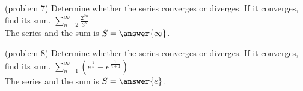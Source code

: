 \documentclass[handout]{ximera}
\begin{document}

\begin{problem}(problem 7)
Determine whether the series converges or diverges.  If it converges, find its sum. $\displaystyle \sum_{n=2}^\infty \frac{2^{2n}}{3^n}$\\
The series  and the sum is $S = \answer{\infty}$.
\end{problem}

\begin{problem}(problem 8)
Determine whether the series converges or diverges.  If it converges, find its sum. $\displaystyle \sum_{n=1}^\infty \left(e^{\frac{1}{n}} - e^{\frac{1}{n+1}}\right)$\\
The series  and the sum is $S = \answer{e}$.
\end{problem}
\end{document}
